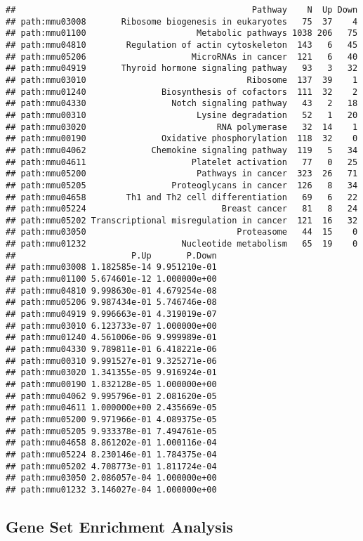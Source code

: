 \documentclass[
  openany]{book}
\begin{document}
\begin{verbatim}
##                                               Pathway    N  Up Down
## path:mmu03008       Ribosome biogenesis in eukaryotes   75  37    4
## path:mmu01100                      Metabolic pathways 1038 206   75
## path:mmu04810        Regulation of actin cytoskeleton  143   6   45
## path:mmu05206                     MicroRNAs in cancer  121   6   40
## path:mmu04919       Thyroid hormone signaling pathway   93   3   32
## path:mmu03010                                Ribosome  137  39    1
## path:mmu01240               Biosynthesis of cofactors  111  32    2
## path:mmu04330                 Notch signaling pathway   43   2   18
## path:mmu00310                      Lysine degradation   52   1   20
## path:mmu03020                          RNA polymerase   32  14    1
## path:mmu00190               Oxidative phosphorylation  118  32    0
## path:mmu04062             Chemokine signaling pathway  119   5   34
## path:mmu04611                     Platelet activation   77   0   25
## path:mmu05200                      Pathways in cancer  323  26   71
## path:mmu05205                 Proteoglycans in cancer  126   8   34
## path:mmu04658        Th1 and Th2 cell differentiation   69   6   22
## path:mmu05224                           Breast cancer   81   8   24
## path:mmu05202 Transcriptional misregulation in cancer  121  16   32
## path:mmu03050                              Proteasome   44  15    0
## path:mmu01232                   Nucleotide metabolism   65  19    0
##                       P.Up       P.Down
## path:mmu03008 1.182585e-14 9.951210e-01
## path:mmu01100 5.674601e-12 1.000000e+00
## path:mmu04810 9.998630e-01 4.679254e-08
## path:mmu05206 9.987434e-01 5.746746e-08
## path:mmu04919 9.996663e-01 4.319019e-07
## path:mmu03010 6.123733e-07 1.000000e+00
## path:mmu01240 4.561006e-06 9.999989e-01
## path:mmu04330 9.789811e-01 6.418221e-06
## path:mmu00310 9.991527e-01 9.325271e-06
## path:mmu03020 1.341355e-05 9.916924e-01
## path:mmu00190 1.832128e-05 1.000000e+00
## path:mmu04062 9.995796e-01 2.081620e-05
## path:mmu04611 1.000000e+00 2.435669e-05
## path:mmu05200 9.971966e-01 4.089375e-05
## path:mmu05205 9.933378e-01 7.494761e-05
## path:mmu04658 8.861202e-01 1.000116e-04
## path:mmu05224 8.230146e-01 1.784375e-04
## path:mmu05202 4.708773e-01 1.811724e-04
## path:mmu03050 2.086057e-04 1.000000e+00
## path:mmu01232 3.146027e-04 1.000000e+00
\end{verbatim}

\hypertarget{gene-set-enrichment-analysis}{%
\subsection{Gene Set Enrichment Analysis}\label{gene-set-enrichment-analysis}}
\end{document}
